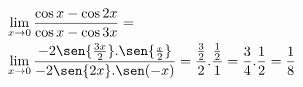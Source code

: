 \begin{ex}
\begin{align}
&\lim_{x\rightarrow 0} \frac{\cos{x}-\cos{2x}}{\cos{x}-\cos{3x}}=\nonumber\\
&\lim_{x\rightarrow 0} \frac{-2\sen{\frac{3x}{2}}.\sen{\frac{_x}{2}}}{-2\sen{2x}.\sen(-x)}=\frac{\frac{3}{2}}{2}.\frac{\frac{1}{2}}{1}=\frac{3}{4}.\frac{1}{2}=\frac{1}{8}\nonumber
\end{align}
\end{ex}
